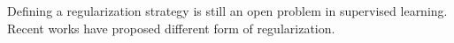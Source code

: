 Defining a regularization strategy is still an open problem in supervised learning. Recent works have proposed different form of regularization.  











%
%
%



%










